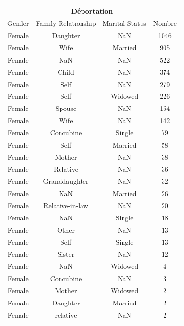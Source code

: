 \documentclass[a4paper,12pt,twoside]{book}
\begin{document}
            \pagebreak  
            
            \begin{longtable}{|c|c|c|c|}
                \hline
                \multicolumn{4}{|c|}{Déportation} \\
                \hline
                Gender & Family Relationship & Marital Status & Nombre \\\hline
                Female & Daughter & NaN & 1046 \\
                Female & Wife & Married & 905 \\
                Female & NaN & NaN & 522 \\
                Female & Child & NaN & 374 \\
                Female & Self & NaN & 279 \\
                Female & Self & Widowed & 226 \\
                Female & Spouse & NaN & 154 \\
                Female & Wife & NaN & 142 \\
                Female & Concubine & Single & 79 \\
                Female & Self & Married & 58 \\
                Female & Mother & NaN & 38 \\
                Female & Relative & NaN & 36 \\
                Female & Granddaughter & NaN & 32 \\
                Female & NaN & Married & 26 \\
                Female & Relative-in-law & NaN & 20 \\
                Female & NaN & Single & 18 \\
                Female & Other & NaN & 13 \\
                Female & Self & Single & 13 \\
                Female & Sister & NaN & 12 \\
                Female & NaN & Widowed & 4 \\
                Female & Concubine & NaN & 3 \\
                Female & Mother & Widowed & 2 \\
                Female & Daughter & Married & 2 \\
                Female & relative & NaN & 2 \\

\end{longtable}
\end{document}
